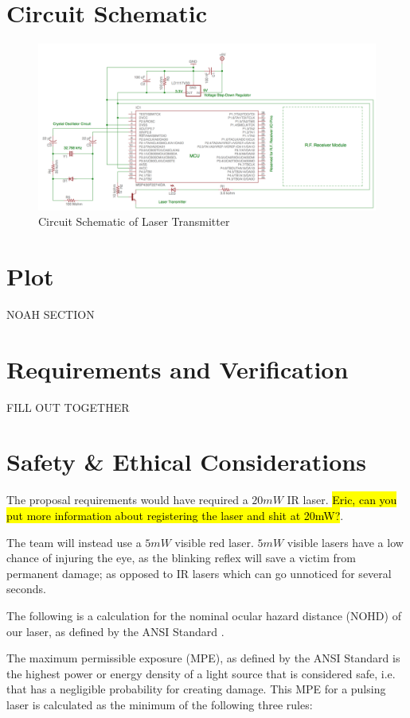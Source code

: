 \documentclass[openbib,letterpaper,10pt]{article}
\begin{document}
\begin{spacing}{1.15}
\section{Circuit Schematic}
\begin{figure} [H]
	\centering
	\includegraphics[scale=0.38]{Circuit_Schematic.png}
	\caption{Circuit Schematic of Laser Transmitter\label{fig:circuit-schematic}}
\end{figure}

\section{Plot}
NOAH SECTION

\section{Requirements and Verification}
FILL OUT TOGETHER

\section{Safety \& Ethical Considerations}
The proposal requirements would have required a $20mW$ IR laser. \hl{Eric, can you put more information about registering the laser and shit at 20mW?}. 

The team will instead use a $5mW$ visible red laser. $5mW$ visible lasers have a low chance of injuring the eye, as the blinking reflex will save a victim from permanent damage; as opposed to IR lasers which can go unnoticed for several seconds. 

The following is a calculation for the nominal ocular hazard distance (NOHD) of our laser, as defined by the ANSI Standard \cite{ANSI}.

The maximum permissible exposure (MPE), as defined by the ANSI Standard \cite{ANSI} is the highest power or energy density of a light source that is considered safe, i.e. that has a negligible probability for creating damage. This MPE for a pulsing laser is calculated as the minimum of the following three rules:


\end{spacing}
\end{document}
